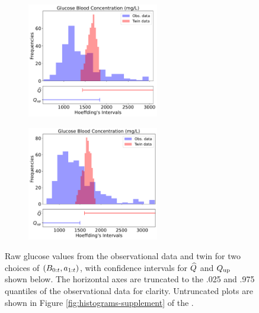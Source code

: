 \begin{figure}%
    \centering
    \begin{subfigure}[b]{0.5\textwidth}
    \centering
    \includegraphics[height=5cm]{figures/causal/latest_experimental_results/truncated_hists/Glucose_hyp_1_with_hoeff_onesided_loFalse_p0.2_nogray.pdf}
    \label{fig:glucosea}
    \end{subfigure}%
    \begin{subfigure}[b]{0.5\textwidth}
    \centering
    \includegraphics[height=5cm]{figures/causal/latest_experimental_results/truncated_hists/Glucose_hyp_5_with_hoeff_onesided_loFalse_p0.2_nogray.pdf}
    \label{fig:glucoseb}
    \end{subfigure}
    \caption{Raw glucose values from the observational data and twin for two choices of $(B_{0:t}, a_{1:t})$, with confidence intervals for $\widehat{Q}$ and $Q_{\mathrm{up}}$ shown below. The horizontal axes are truncated to the .025 and .975 quantiles of the observational data for clarity. Untruncated plots are shown in Figure \ref{fig:histograms-supplement} of the \AppendixName.}

\end{figure}
